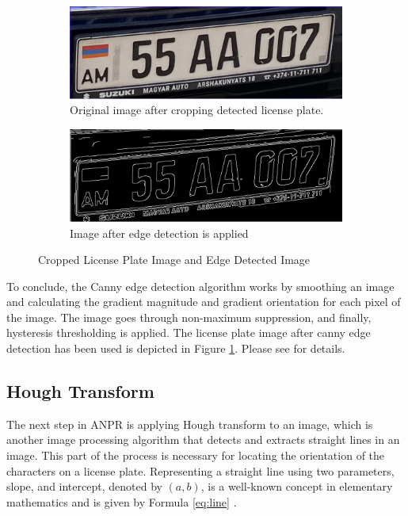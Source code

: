 \documentclass[conference]{IEEEtran}
\begin{document}
\begin{figure}[ht]
  \centering
  \begin{subfigure}[b]{0.45\linewidth}
    \includegraphics[width=\linewidth]{images/Picture16.png}
    \caption{Original image after cropping detected license plate. }
  \end{subfigure}
  \begin{subfigure}[b]{0.45\linewidth}
    \includegraphics[width=\linewidth]{images/Picture17.png}
    \caption{Image after edge detection is applied}
  \end{subfigure}
  \caption{Cropped License Plate Image and Edge Detected Image}
  \label{fig:combined5}
\end{figure}

To conclude, the Canny edge detection algorithm works by smoothing an image and calculating the gradient magnitude and gradient orientation for each pixel of the image. The image goes through non-maximum suppression, and finally, hysteresis thresholding is applied. The license plate image after canny edge detection has been used is depicted in Figure \ref{fig:combined5}. Please see \cite{b14} for details.

\subsection{Hough Transform}

The next step in ANPR is applying Hough transform to an image, which is another image processing algorithm that detects and extracts straight lines in an image. This part of the process is necessary for locating the orientation of the characters on a license plate. 
Representing a straight line using two parameters, slope, and intercept, denoted by $(a,b)$, is a well-known concept in elementary mathematics and is given by Formula \ref{eq:line} \cite{b15}.
\end{document}
